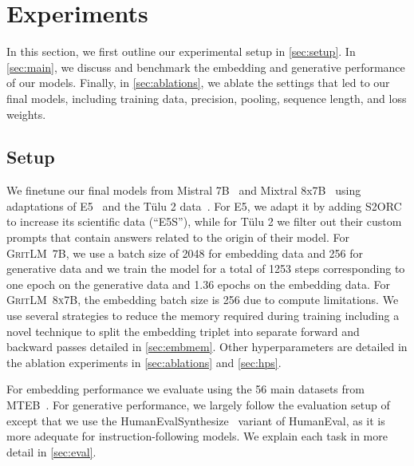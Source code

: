 \documentclass{article}
\newcommand{\modelbase}{\textsc{GritLM~7B}}
\newcommand{\modelbig}{\textsc{GritLM~8x7B}}
\newcommand{\tulu}{T\"ulu}
\begin{document}

\section{Experiments}
\label{sec:exp}

In this section, we first outline our experimental setup in \autoref{sec:setup}. In \autoref{sec:main}, we discuss and benchmark the embedding and generative performance of our models. Finally, in \autoref{sec:ablations}, we ablate the settings that led to our final models, including training data, precision, pooling, sequence length, and loss weights.

\subsection{Setup}
\label{sec:setup}

We finetune our final models from Mistral 7B~\cite{jiang2023mistral} and Mixtral 8x7B~\cite{jiang2024mixtral} using adaptations of E5~\cite{wang2024improving} and the \tulu{} 2 data~\cite{ivison2023camels}. For E5, we adapt it by adding S2ORC~\cite{lo2020s2orc} to increase its scientific data (``E5S''), while for \tulu{} 2 we filter out their custom prompts that contain answers related to the origin of their model. For \modelbase{}, we use a batch size of 2048 for embedding data and 256 for generative data and we train the model for a total of 1253 steps corresponding to one epoch on the generative data and 1.36 epochs on the embedding data. For \modelbig{}, the embedding batch size is 256 due to compute limitations. We use several strategies to reduce the memory required during training including a novel technique to split the embedding triplet into separate forward and backward passes detailed in \autoref{sec:embmem}. Other hyperparameters are detailed in the ablation experiments in \autoref{sec:ablations} and \autoref{sec:hps}. 

For embedding performance we evaluate using the 56 main datasets from MTEB~\cite{muennighoff2023mteb}. For generative performance, we largely follow the evaluation setup of \citet{ivison2023camels} except that we use the HumanEvalSynthesize~\cite{muennighoff2023octopack} variant of HumanEval, as it is more adequate for instruction-following models. We explain each task in more detail in \autoref{sec:eval}.
\end{document}
